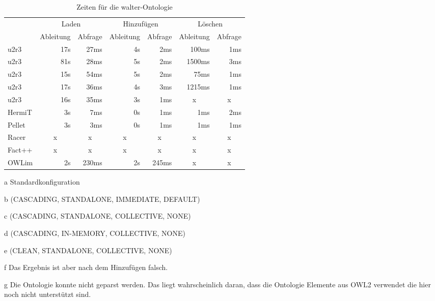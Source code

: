 \begin{table}[htbp]
\caption{Zeiten für die walter-Ontologie}
\label{table-time-walter}
\begin{center}
\begin{threeparttable}
\begin{tabular}{l|r|r|r|r|r|r|}
\cline{2-7}
 & \multicolumn{2}{|c|}{Laden} & \multicolumn{2}{|c|}{Hinzufügen} & \multicolumn{2}{|c|}{Löschen} \\
\cline{2-7}
 & \multicolumn{1}{|c|}{Ableitung} & \multicolumn{1}{|c|}{Abfrage} & \multicolumn{1}{|c|}{Ableitung} & \multicolumn{1}{|c|}{Abfrage} & \multicolumn{1}{|c|}{Ableitung} & \multicolumn{1}{|c|}{Abfrage} \\
\hline
\multicolumn{1}{|l|}{u2r3\tnote{a}} & 17s & 27ms & 4s & 2ms & 100ms & 1ms \\ \hline
\multicolumn{1}{|l|}{u2r3\tnote{b}} & 81s & 28ms & 5s & 2ms & 1500ms & 3ms \\ \hline
\multicolumn{1}{|l|}{u2r3\tnote{c}} & 15s & 54ms & 5s & 2ms & 75ms & 1ms \\ \hline
\multicolumn{1}{|l|}{u2r3\tnote{d}} & 17s & 36ms & 4s & 3ms & 1215ms & 1ms \\ \hline
\multicolumn{1}{|l|}{u2r3\tnote{e}} & 16s & 35ms & 3s & 1ms & \multicolumn{1}{c|}{x} & \multicolumn{1}{c|}{x} \\ \hline
\multicolumn{1}{|l|}{HermiT} & 3s & 7ms & 0s & 1ms & 1ms & 2ms \\ \hline
\multicolumn{1}{|l|}{Pellet\tnote{f}} & 3s & 3ms & 0s & 1ms & 1ms & 1ms \\ \hline
\multicolumn{1}{|l|}{Racer\tnote{g}} & \multicolumn{1}{c|}{x} & \multicolumn{1}{c|}{x} & \multicolumn{1}{c|}{x} & \multicolumn{1}{c|}{x} & \multicolumn{1}{c|}{x} & \multicolumn{1}{c|}{x} \\ \hline
\multicolumn{1}{|l|}{Fact++\tnote{g}} & \multicolumn{1}{c|}{x} & \multicolumn{1}{c|}{x} & \multicolumn{1}{c|}{x} & \multicolumn{1}{c|}{x} & \multicolumn{1}{c|}{x} & \multicolumn{1}{c|}{x} \\ \hline
\multicolumn{1}{|l|}{OWLim} & 2s & 230ms & 2s & 245ms & \multicolumn{1}{c|}{x} & \multicolumn{1}{c|}{x} \\ \hline
\end{tabular}
\begin{tablenotes}
	\item[a] Standardkonfiguration
	\item[b] (CASCADING, STANDALONE, IMMEDIATE, DEFAULT)
	\item[c] (CASCADING, STANDALONE, COLLECTIVE, NONE)
	\item[d] (CASCADING, IN-MEMORY, COLLECTIVE, NONE)
	\item[e] (CLEAN, STANDALONE, COLLECTIVE, NONE)
	\item[f] Das Ergebnis ist aber nach dem Hinzufügen falsch.
	\item[g] Die Ontologie konnte nicht geparst werden. Das liegt wahrscheinlich daran, dass die Ontologie Elemente aus OWL2 verwendet die hier noch nicht unterstützt sind.
\end{tablenotes}
\end{threeparttable}
\end{center}
\end{table}

